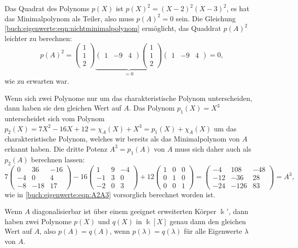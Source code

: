 \begin{beispiel}
Das Quadrat des Polynoms $p(X)$ ist $p(X)^2 = (X-2)^2(X-3)^2$, es hat
das Minimalpolynom als Teiler, also muss $p(A)^2=0$ sein.
Die Gleichung \eqref{buch:eigenwerte:eqn:nichtminimalpolynom} ermöglicht,
das Quaddrat $p(A)^2$ leichter zu berechnen:
\[
p(A)^2
=
\begin{pmatrix}1\\1\\2\end{pmatrix}
\underbrace{
\begin{pmatrix}1&-9&4\end{pmatrix}
\begin{pmatrix}1\\1\\2\end{pmatrix}
}_{\displaystyle = 0}
\begin{pmatrix}1&-9&4\end{pmatrix}
=
0
,
\]
wie zu erwarten war.

Wenn sich zwei Polynome nur um das charakteristische Polynom unterscheiden,
dann haben sie den gleichen Wert auf $A$.
Das Polynom $p_1(X)=X^3$ unterscheidet sich vom Polynom
$p_2(X)=7X^2-16X+12=\chi_A(X)+X^3=p_1(X)+\chi_A(X)$ 
um das charakteristische Polynom, welches wir bereits als das Minimalpolynom
von $A$ erkannt haben.
Die dritte Potenz $A^3=p_1(A)$ von $A$ muss sich daher auch als $p_2(A)$
berechnen lassen:
\[
7
\begin{pmatrix}
  0&  36& -16 \\
 -4&   0&   4 \\
 -8& -18&  17 
\end{pmatrix}
-16
\begin{pmatrix}
   1&  9& -4\\
  -1&  3&  0\\
  -2&  0&  3
\end{pmatrix}
+12
\begin{pmatrix}
1&0&0\\
0&1&0\\
0&0&1
\end{pmatrix}
=
\begin{pmatrix}
 -4& 108&  -48\\
-12& -36&   28\\
-24&-126&   83
\end{pmatrix}
=
A^3,
\]
wie in \eqref{buch:eigenwerte:eqn:A2A3} vorsorglich berechnet worden ist.
\end{beispiel}

\begin{satz}
Wenn $A$ diagonalisierbar ist über einem geeignet erweiterten Körper $\Bbbk'$,
dann haben zwei Polynome $p(X)$ und $q(X)$ in $\Bbbk[X]$ genau dann
den gleichen Wert auf $A$, also $p(A)=q(A)$, wenn $p(\lambda) = q(\lambda)$
für alle Eigenwerte $\lambda$ von $A$.
\end{satz}

